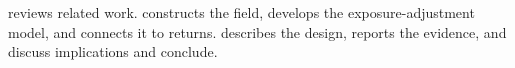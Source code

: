 reviews related work.
 constructs the field,
 develops the exposure-adjustment model, and
 connects it to returns.
 describes the design,
 reports the evidence, and
 discuss implications and conclude.
